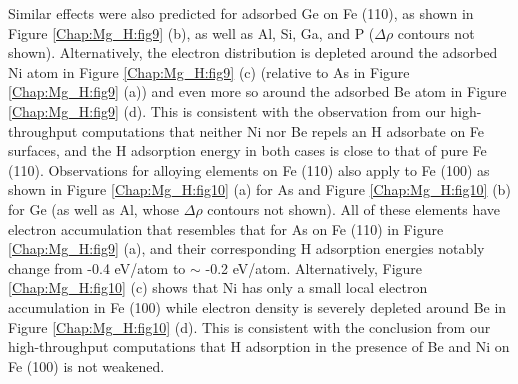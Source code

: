 Similar effects were also predicted for adsorbed Ge on Fe (110), as shown in Figure \ref{Chap:Mg_H:fig9} (b), as well as Al, Si, Ga, and P ($\Delta \rho$ contours not shown). Alternatively, the electron distribution is depleted around the adsorbed Ni atom in Figure \ref{Chap:Mg_H:fig9} (c) (relative to As in Figure \ref{Chap:Mg_H:fig9} (a)) and even more so around the adsorbed Be atom in Figure \ref{Chap:Mg_H:fig9} (d). This is consistent with the observation from our high-throughput computations that neither Ni nor Be repels an H adsorbate on Fe surfaces, and the H adsorption energy in both cases is close to that of pure Fe (110). Observations for alloying elements on Fe (110) also apply to Fe (100) as shown in Figure \ref{Chap:Mg_H:fig10} (a) for As and Figure \ref{Chap:Mg_H:fig10} (b) for Ge (as well as Al, whose $\Delta \rho$ contours not shown). All of these elements have electron accumulation that resembles that for As on Fe (110) in Figure \ref{Chap:Mg_H:fig9} (a), and their corresponding H adsorption energies notably change from -0.4 eV/atom to $\sim$ -0.2 eV/atom. Alternatively, Figure \ref{Chap:Mg_H:fig10} (c) shows that Ni has only a small local electron accumulation in Fe (100) while electron density is severely depleted around Be in Figure \ref{Chap:Mg_H:fig10} (d). This is consistent with the conclusion from our high-throughput computations that H adsorption in the presence of Be and Ni on Fe (100) is not weakened.


